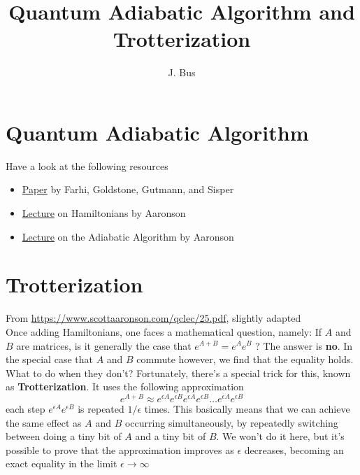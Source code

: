 \documentclass[]{article}
\title{Quantum Adiabatic Algorithm and Trotterization}
\author{J. Bus}
\begin{document}
\maketitle

\section{Quantum Adiabatic Algorithm}
Have a look at the following resources
\begin{itemize}
	\item \href{https://arxiv.org/abs/quant-ph/0001106}{Paper} by Farhi, Goldstone, Gutmann, and Sisper
	\item \href{https://www.scottaaronson.com/qclec/25.pdf}{Lecture} on Hamiltonians by Aaronson
	\item \href{https://www.scottaaronson.com/qclec/26.pdf}{Lecture} on the Adiabatic Algorithm by Aaronson 
\end{itemize}

\section{Trotterization}
From \url{https://www.scottaaronson.com/qclec/25.pdf}, slightly adapted\\

Once adding Hamiltonians, one faces a mathematical question, namely: If $A$ and $B$ are matrices, is it generally the case that $e^{A+B} = e^Ae^B$ ? The answer is \textbf{no}. In the special case that $A$ and $B$ commute however, we find that the equality holds. What to do when they don't? Fortunately, there's a special trick for this, known as \textbf{Trotterization}. It uses the following approximation
\begin{equation}
	e^{A+B} \approx e^{\epsilon A}e^{\epsilon B}e^{\epsilon A}e^{\epsilon B}\dots e^{\epsilon A}e^{\epsilon B}
\end{equation}
each step $e^{\epsilon A}e^{\epsilon B}$ is repeated $1/\epsilon$ times. This basically means that we can achieve the same effect as $A$ and $B$ occurring simultaneously, by repeatedly switching between doing a tiny bit of $A$ and a tiny bit of $B$. We won’t do it here, but it’s possible to prove that the approximation improves as $\epsilon$ decreases, becoming an exact equality in the limit $\epsilon \to \infty$
\end{document}
